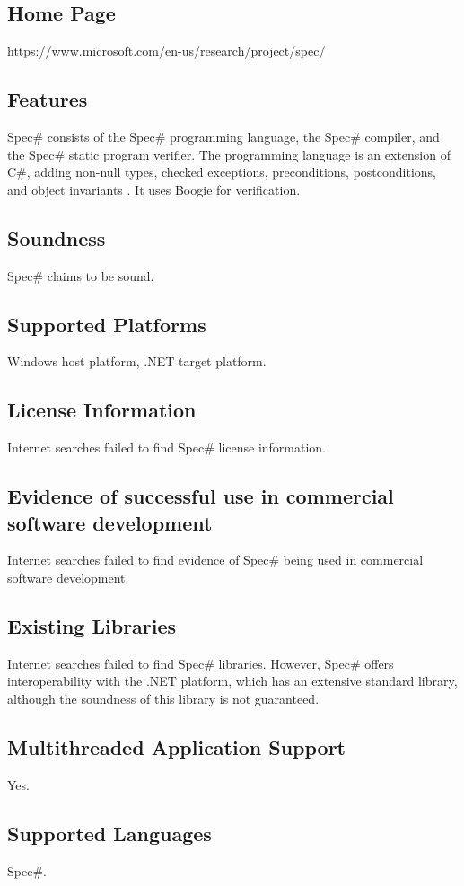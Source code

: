 \documentclass[12pt,openany,a4paper]{book}
\begin{document}
	\subsection{Home Page}%
	https://www.microsoft.com/en-us/research/project/spec/
	\subsection{Features}
		Spec\# consists of the Spec\# programming language, the Spec\# compiler, and the Spec\# static program verifier. The programming language is an extension of C\#, adding non-null types, checked exceptions, preconditions, postconditions, and object invariants \cite{spec01}. It uses Boogie for verification.
	\subsection{Soundness}
		Spec\# claims to be sound\cite{BarnettMike2005TSPS}.
	\subsection{Supported Platforms}
		Windows host platform, .NET target platform.
	\subsection{License Information}
		Internet searches failed to find Spec\# license information.
	\subsection{Evidence of successful use in commercial software development}
		Internet searches failed to find evidence of Spec\# being used in commercial software development.
	\subsection{Existing Libraries}
		Internet searches failed to find Spec\# libraries. However, Spec\# offers interoperability with the .NET platform, which has an extensive standard library, although the soundness of this library is not guaranteed.
	\subsection{Multithreaded Application Support}
		Yes\cite{spec01}.
	\subsection{Supported Languages}
		Spec\#.
\end{document}
